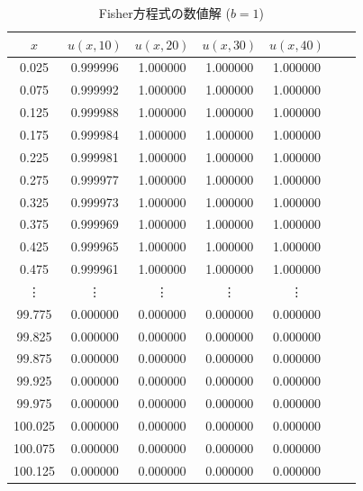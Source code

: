 \documentclass[a4j, titlepage]{jsarticle}
\numberwithin{equation}{section}
\begin{document}
            \begin{table}[h]
                \caption{Fisher方程式の数値解 ($b = 1$)}
                \label{tab:fisher100}
                \centering
                \begin{tabular}{ccccccc}
                    \hline
                    $x$ & $u(x, 10)$ & $u(x, 20)$ & $u(x, 30)$ & $u(x, 40)$
                    \\
                    \hline
                    \hline
                    0.025 & 0.999996 & 1.000000 & 1.000000 & 1.000000 \\
                    0.075 & 0.999992 & 1.000000 & 1.000000 & 1.000000 \\
                    0.125 & 0.999988 & 1.000000 & 1.000000 & 1.000000 \\
                    0.175 & 0.999984 & 1.000000 & 1.000000 & 1.000000 \\
                    0.225 & 0.999981 & 1.000000 & 1.000000 & 1.000000 \\
                    0.275 & 0.999977 & 1.000000 & 1.000000 & 1.000000 \\
                    0.325 & 0.999973 & 1.000000 & 1.000000 & 1.000000 \\
                    0.375 & 0.999969 & 1.000000 & 1.000000 & 1.000000 \\
                    0.425 & 0.999965 & 1.000000 & 1.000000 & 1.000000 \\
                    0.475 & 0.999961 & 1.000000 & 1.000000 & 1.000000 \\
                    \vdots & \vdots & \vdots & \vdots & \vdots \vspace{1mm} \\
                    99.775 & 0.000000 & 0.000000 & 0.000000 & 0.000000 \\
                    99.825 & 0.000000 & 0.000000 & 0.000000 & 0.000000 \\
                    99.875 & 0.000000 & 0.000000 & 0.000000 & 0.000000 \\
                    99.925 & 0.000000 & 0.000000 & 0.000000 & 0.000000 \\
                    99.975 & 0.000000 & 0.000000 & 0.000000 & 0.000000 \\
                    100.025 & 0.000000 & 0.000000 & 0.000000 & 0.000000 \\
                    100.075 & 0.000000 & 0.000000 & 0.000000 & 0.000000 \\
                    100.125 & 0.000000 & 0.000000 & 0.000000 & 0.000000 \\

\end{tabular}
\end{table}
\end{document}
